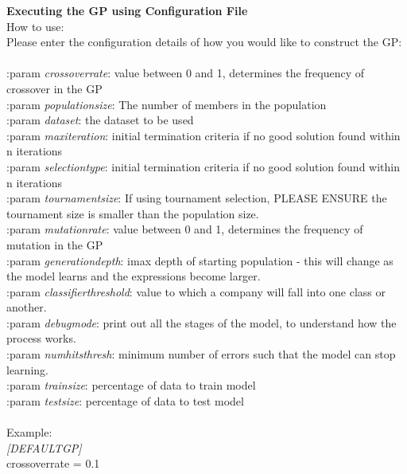 \documentclass[11pt]{article}
\begin{document}
\newpage
\textbf{Executing the GP using Configuration File}\\
How to use:\\
Please enter the configuration details of how you would like to construct the GP:\\
\\
   :param \textit{cross\textunderscore over\textunderscore rate}: value between 0 and 1, determines the frequency of crossover in the GP\\
   :param \textit{population\textunderscore size}: The number of members in the population \\
   :param \textit{data\textunderscore set}:  the dataset to be used \\
   :param \textit{max\textunderscore iteration}: initial termination criteria if no good solution found within n iterations\\
   :param \textit{selection\textunderscore type}: initial termination criteria if no good solution found within n iterations\\
   :param \textit{tournament\textunderscore size}: If using tournament selection, PLEASE ENSURE the tournament size is smaller than the population size.\\
   :param \textit{mutation\textunderscore rate}: value between 0 and 1, determines the frequency of mutation in the GP\\
   :param \textit{generation\textunderscore depth}: imax depth of starting population - this will change as the model learns and the expressions become larger.\\
   :param \textit{classifier\textunderscore threshold}: value to which a company will fall into one class or another.\\
   :param \textit{debug\textunderscore mode}: print out all the stages of the model, to understand how the process works.\\
   :param \textit{num\textunderscore hits\textunderscore thresh}: minimum number of errors such that the model can stop learning.\\
   :param \textit{train\textunderscore size}: percentage of data to train model\\
   :param \textit{test\textunderscore size}: percentage of data to test model\\
\\
Example:\\
\textit{[DEFAULT\textunderscore GP] }\\
cross\textunderscore over\textunderscore rate = 0.1\\
\end{document}
